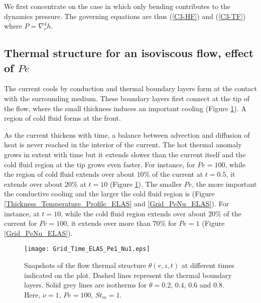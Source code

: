 We first concentrate on the case  in which only bending contributes to
the dynamics pressure.  The governing equations are thus (\ref{C3-HF}) and
(\ref{C3-TF}) where  $P=\nabla_r^4h$.  

\subsection{Thermal structure for an isoviscous flow, effect of $Pe$}
\label{sec:thermal-structure-an}

The current  cools by conduction  and thermal boundary layers  form at
the contact with the surrounding  medium.  These boundary layers first
connect at the  tip of the flow, where the  small thickness induces an
important  cooling (Figure  \ref{Grid_Time_ELAS}).  A  region of  cold
fluid forms at the front.

As the  current thickens  with time, a  balance between  advection and
diffusion of heat is never reached in the interior of the current. The
hot thermal  anomaly grows in extent  with time but it  extends slower
than the  current itself and  the cold fluid  region at the  tip grows
even faster.   For instance, for $Pe  =100$, while the region  of cold
fluid extends over about $10\%$ of  the current at $t=0.5$, it extends
over  about  $20\%$ at  $t  =10$  (Figure \ref{Grid_Time_ELAS}).   The
smaller $Pe$,  the more  important the  conductive
cooling   and  the   larger   the  cold   fluid   region  is   (Figure
\ref{Thickness_Temperature_Profile_ELAS}   and  \ref{Grid_PeNu_ELAS}).
For  instance, at  $t=10$, while  the cold  fluid region  extends over
about $20\%$  of the current for  $Pe=100$, it extends over  more than
$70\%$ for $Pe=1$ (Figure \ref{Grid_PeNu_ELAS}).

\begin{figure}
  \begin{center}
    \graphicspath{ {/Users/thorey/Documents/These/Projet/Refroidissement/Skin_Model/Figure/JFM_V13/} }
    \texttt{[image: Grid\_Time\_ELAS\_Pe1\_Nu1.eps]}
    \caption{Snapshots of  the flow thermal  structure $\theta(r,z,t)$
      at  different  times  indicated   on  the  plot.   Dashed  lines
      represent  the thermal  boundary  layers. Solid  grey lines  are
      isotherms for  $\theta =  0.2$, $0.4$,  $0.6$ and  $0.8$.  Here,
      $\nu=1$, $Pe =100$, $St_m = 1$.}
    \label{Grid_Time_ELAS}
  \end{center}
\end{figure}

